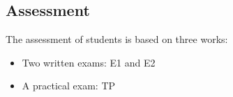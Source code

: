\documentclass[ 12pt]{article}
\begin{document}
  
  
  
  \subsection{Assessment}
\label{sec:project}

The assessment  of students is based on three works:
\begin{itemize}
\item Two  written  exams: E1 and E2
\item  A practical exam: TP
 \end{itemize}





\end{document}
